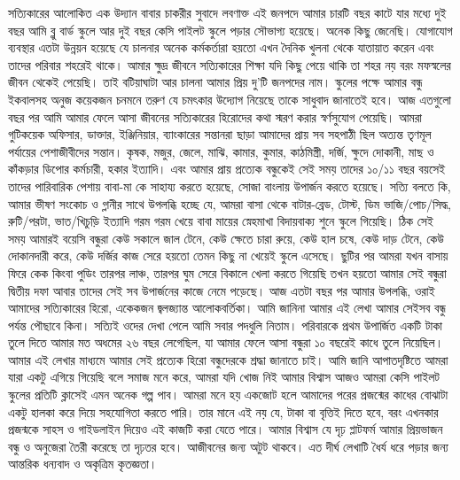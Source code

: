 \documentclass{report}
\begin{document}
\begin{itemize}
সত্যিকারের আলোকিত এক উদ্যান
বাবার চাকরীর সুবাদে লবণাক্ত এই জনপদে আমার চারটি বছর কাটে যার মধ্যে দুই বছর আমি ব্লু বার্ড স্কুলে আর দুই বছর কেসি পাইলট স্কুলে পড়ার সৌভাগ্য হয়েছে। অনেক কিছু জেনেছি। যোগাযোগ ব্যবস্থার এতটা উন্নয়ন হয়েছে যে চালনার অনেক কর্মকর্তারা হয়তো এখন দৈনিক খুলনা থেকে যাতায়াত করেন এবং তাদের পরিবার শহরেই থাকে। আমার ক্ষুদ্র জীবনে সত্যিকারের শিক্ষা যদি কিছু পেয়ে থাকি তা শহর নয় বরং মফস্বলের জীবন থেকেই পেয়েছি। তাই বটিয়াঘাটা আর চালনা আমার প্রিয় দু’টি জনপদের নাম। স্কুলের পক্ষে আমার বন্ধু ইকবালসহ অনুজ কয়েকজন চনমনে তরুণ যে চমৎকার উদ্যোগ নিয়েছে তাকে সাধুবাদ জানাতেই হবে। আজ এতগুলো বছর পর আমি আমার ফেলে আসা জীবনের সত্যিকারের হিরোদের কথা স্মরণ করার স্বর্ণসুযোগ পেয়েছি। আমরা গুটিকয়েক অফিসার, ডাক্তার, ইঞ্জিনিয়ার, ব্যাংকারের সন্তানরা ছাড়া আমাদের প্রায় সব সহপাঠী ছিল অত্যন্ত তৃণমূল পর্যায়ের পেশাজীবীদের সন্তান। কৃষক, মজুর, জেলে, মাঝি, কামার, কুমার, কাঠমিস্ত্রী, দর্জি, ক্ষুদে দোকানী, মাছ ও কাঁকড়ার ডিপোর কর্মচারী, হকার ইত্যাদি। এবং আমার প্রায় প্রত্যেক বন্ধুকেই সেই সময় তাদের ১০/১১ বছর বয়সেই তাদের পারিবারিক পেশায় বাবা-মা কে সাহায্য করতে হয়েছে, সোজা বাংলায় উপার্জন করতে হয়েছে। সত্যি বলতে কি, আমার ভীষণ সংকোচ ও গ্লানীর সাথে উপলব্ধি হচ্ছে যে, আমরা বাসা থেকে বাটার-ব্রেড, টোস্ট, ডিম ভাজি/পোচ/সিদ্ধ, রুটি/পরটা, ভাত/খিচুড়ি ইত্যাদি গরম গরম খেয়ে বাবা মায়ের স্নেহমাখা বিদায়বাক্য শুনে স্কুলে গিয়েছি। ঠিক সেই সময় আমারই বয়েসি বন্ধুরা কেউ সকালে জাল টেনে, কেউ ক্ষেতে চারা রুয়ে, কেউ হাল চষে, কেউ দাড় টেনে, কেউ দোকানদারী করে, কেউ দর্জির কাজ সেরে হয়তো তেমন কিছু না খেয়েই স্কুলে এসেছে। ছুটির পর আমরা যখন বাসায় ফিরে কেক কিংবা পুডিং তারপর লাঞ্চ, তারপর ঘুম সেরে বিকালে খেলা করতে গিয়েছি তখন হয়তো আমার সেই বন্ধুরা দ্বিতীয় দফা আবার তাদের সেই সব উপার্জনের কাজে নেমে পড়েছে। আজ এতটা বছর পর আমার উপলব্ধি, ওরাই আমাদের সত্যিকারের হিরো, একেকজন জ্বলজ্যান্ত আলোকবর্তিকা। আমি জানিনা আমার এই লেখা আমার সেইসব বন্ধু পর্যন্ত পৌছাবে কিনা। সত্যিই ওদের দেখা পেলে আমি সবার পদধুলি নিতাম। পরিবারকে প্রথম উপার্জিত একটি টাকা তুলে দিতে আমার মত অধমের ২৬ বছর লেগেছিল, যা আমার ফেলে আসা বন্ধুরা ১০ বছরেই কাধে তুলে নিয়েছিল। আমার এই লেখার মাধ্যমে আমার সেই প্রত্যেক হিরো বন্ধুদেরকে শ্রদ্ধা জানাতে চাই। আমি জানি আপাতদৃষ্টিতে আমরা যারা একটু এগিয়ে গিয়েছি বলে সমাজ মনে করে, আমরা যদি খোজ নিই আমার বিশ্বাস আজও আমরা কেসি পাইলট স্কুলের প্রতিটি ক্লাসেই এমন অনেক গল্প পাব। আমরা মনে হয় একজোট হলে আমাদের পরের প্রজন্মের কাধের বোঝাটা একটু হালকা করে দিয়ে সহযোগিতা করতে পারি। তার মানে এই নয় যে, টাকা বা বৃত্তিই দিতে হবে, বরং এখনকার প্রজন্মকে সাহস ও গাইডলাইন দিয়েও এই কাজটি করা যেতে পারে। আমার বিশ্বাস যে দৃঢ় প্লাটফর্ম আমার প্রিয়ভাজন বন্ধু ও অনুজেরা তৈরী করেছে তা দৃঢ়তর হবে। আজীবনের জন্য অটুট থাকবে।
এত দীর্ঘ লেখাটি ধৈর্য ধরে পড়ার জন্য আন্তরিক ধন্যবাদ ও অকৃত্রিম কৃতজ্ঞতা।
\end{itemize}
\end{document}
